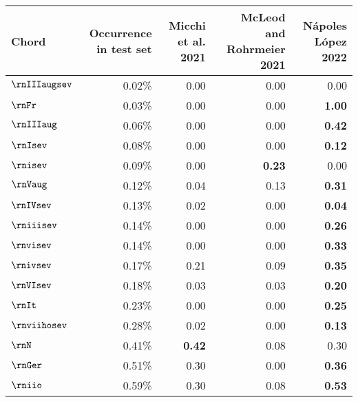 \begin{tabular}{l|rrrr}
Chord & Occurrence in test set & Micchi et al. 2021 & McLeod and Rohrmeier 2021 & Nápoles López 2022 \\
\hline
$\rnIIIaugsev$ & 0.02\%                 & 0.00                 & 0.00                        & 0.00           \\
$\rnFr$     & 0.03\%                 & 0.00                 & 0.00                        & \textbf{1.00}  \\
$\rnIIIaug$    & 0.06\%                 & 0.00                 & 0.00                        & \textbf{0.42}  \\
$\rnIsev$      & 0.08\%                 & 0.00                 & 0.00                        & \textbf{0.12}  \\
$\rnisev$      & 0.09\%                 & 0.00                 & \textbf{0.23}               & 0.00           \\
$\rnVaug$      & 0.12\%                 & 0.04                 & 0.13                        & \textbf{0.31}  \\
$\rnIVsev$     & 0.13\%                 & 0.02                 & 0.00                        & \textbf{0.04}  \\
$\rniiisev$    & 0.14\%                 & 0.00                 & 0.00                        & \textbf{0.26}  \\
$\rnvisev$     & 0.14\%                 & 0.00                 & 0.00                        & \textbf{0.33}  \\
$\rnivsev$     & 0.17\%                 & 0.21                 & 0.09                        & \textbf{0.35}  \\
$\rnVIsev$     & 0.18\%                 & 0.03                 & 0.03                        & \textbf{0.20}  \\
$\rnIt$        & 0.23\%                 & 0.00                 & 0.00                        & \textbf{0.25}  \\
$\rnviihosev$  & 0.28\%                 & 0.02                 & 0.00                        & \textbf{0.13}  \\
$\rnN$         & 0.41\%                 & \textbf{0.42}        & 0.08                        & 0.30           \\
$\rnGer$    & 0.51\%                 & 0.30                 & 0.00                        & \textbf{0.36}  \\
$\rniio$       & 0.59\%                 & 0.30                 & 0.08                        & \textbf{0.53}  \\

\end{tabular}
